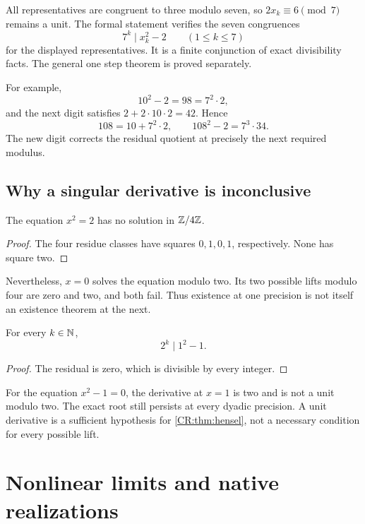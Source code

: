 All representatives are congruent to three modulo seven, so $2x_k\equiv6\pmod7$ remains a unit. The formal statement  verifies the seven congruences
\[
7^k\mid x_k^2-2\qquad (1\leq k\leq7)
\]
for the displayed representatives. It is a finite conjunction of exact divisibility facts. The general one step theorem is proved separately.

For example,
\[
10^2-2=98=7^2\cdot2,
\]
and the next digit satisfies $2+2\cdot10\cdot2=42$. Hence
\[
108=10+7^2\cdot2,
\qquad 108^2-2=7^3\cdot34.
\]
The new digit corrects the residual quotient at precisely the next required modulus.

\subsection{Why a singular derivative is inconclusive}
\begin{CRproposition}\label{CR:prop:mod4}
The equation $x^2=2$ has no solution in $\mathbb{Z}/4\mathbb{Z}$.
\end{CRproposition}
\begin{proof}
The four residue classes have squares $0,1,0,1$, respectively. None has square two.
\end{proof}

Nevertheless, $x=0$ solves the equation modulo two. Its two possible lifts modulo four are zero and two, and both fail. Thus existence at one precision is not itself an existence theorem at the next.

\begin{CRproposition}\label{CR:prop:singular-success}
For every $k\in\mathbb{N}$,
\[
2^k\mid 1^2-1.
\]
\end{CRproposition}
\begin{proof}
The residual is zero, which is divisible by every integer.
\end{proof}

For the equation $x^2-1=0$, the derivative at $x=1$ is two and is not a unit modulo two. The exact root still persists at every dyadic precision. A unit derivative is a sufficient hypothesis for \cref{CR:thm:hensel}, not a necessary condition for every possible lift.

\section{Nonlinear limits and native realizations}\label{CR:cr-source-section-7}\label{CR:ch:limits}
